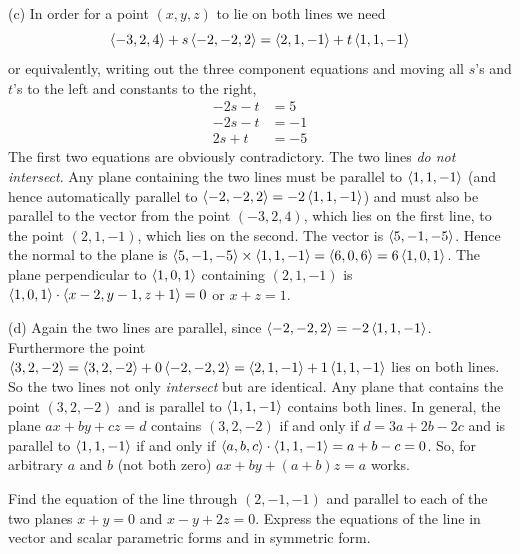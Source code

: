 \begin{solution}
(c) In order for a point $(x,y,z)$ to lie on both lines we need
\begin{equation*}
\left< -3,2,4\right>+s\left< -2,-2,2\right> = \left< 2,1,-1\right>+t\left< 1,1,-1\right>
\end{equation*}
or equivalently, writing out the three component equations and moving
all $s$'s and $t$'s to the left and constants to the right,
\begin{align*}
-2s -t &= 5\\
-2s -t &= -1\\
2s +t &= -5
\end{align*}
The first two equations are obviously contradictory. The
two lines \emph{do not intersect}. Any plane containing the two lines 
must be parallel to $\left< 1,1,-1\right>$ (and hence automatically parallel
to $\left< -2,-2,2\right>=-2\left< 1,1,-1\right>$) and must also be parallel to the vector
from the point $(-3,2,4)$, which lies on the first line, to the point
$(2,1,-1)$, which lies on the second. The vector is $\left< 5,-1,-5\right>$. 
Hence the normal to the plane is 
$\left< 5,-1,-5\right>\times\left< 1,1,-1\right>=\left< 6,0,6\right>=6\left< 1,0,1\right>$.
The plane perpendicular to $\left< 1,0,1\right>$ containing $(2,1,-1)$ is
$\left< 1,0,1\right>\cdot\left< x-2,y-1,z+1\right>=0$ or $x+z=1$.

(d) Again the two lines are parallel, since 
$\left< -2,-2,2\right>=-2\left< 1,1,-1\right>$.
Furthermore the point 
$\left< 3,2,-2\right>=\left< 3,2,-2\right>+0\left< -2,-2,2\right>
       =\left< 2,1,-1\right>+1\left< 1,1,-1\right>$
lies on both lines. So the two lines not only \emph{intersect} but
are identical. Any plane that contains the point $(3,2,-2)$ and is parallel
to $\left< 1,1,-1\right>$ contains both lines. In general, the plane $ax+by+cz=d$
contains $(3,2,-2)$ if and only if $d=3a+2b-2c$ and is parallel to 
$\left< 1,1,-1\right>$ if and only if $\left< a,b,c\right>\cdot\left< 1,1,-1\right>=a+b-c=0$. So, for arbitrary $a$ and $b$ (not both zero) $ax+by+(a+b)z=a$ works.
\end{solution}




\begin{question}
Find the equation of the line through $(2,-1,-1)$ and parallel
to each of the two planes $x+y=0$ and $x-y+2z=0$. Express the equations
of the line in vector and scalar parametric forms and in symmetric form.
\end{question}

%

